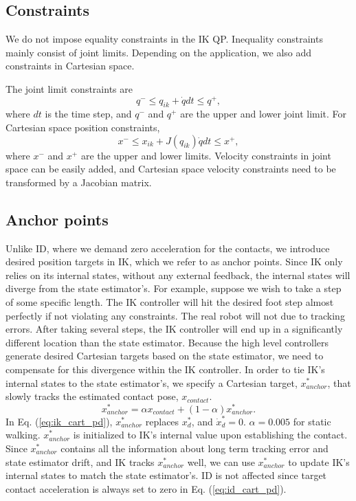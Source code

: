 \documentclass{ws-ijhr}
\newcommand{\eref}[1] {Eq. (\ref{#1})}
\begin{document}
\subsection{Constraints}
We do not impose equality constraints in the IK QP. Inequality constraints 
mainly consist of joint limits. Depending on the application, we also add 
constraints in Cartesian space. 

The joint limit constraints are 
\begin{equation}
  q^- \leq q_{ik} + \dot{q}dt \leq q^+,
\end{equation}
where $dt$ is the time step, and $q^-$ and $q^+$ are the upper and lower joint 
limit. 
For Cartesian space position constraints, 
\begin{equation}
  x^- \leq x_{ik} + J(q_{ik})\dot{q}dt \leq x^+,
	\label{eq:ik_cart_ineq}
\end{equation}
where $x^-$ and $x^+$ are the upper and lower limits. 
Velocity constraints in joint space can be easily added, and Cartesian space 
velocity constraints need to be transformed by a Jacobian matrix. 
 
\subsection{Anchor points}
\label{sec:anchor}
Unlike ID, where we demand zero acceleration for the contacts,
we introduce desired position targets in IK, which we refer to as anchor points. 
Since IK only relies on its internal states, without any external feedback, 
the internal states will diverge from the state estimator's.
For example, suppose we wish to take a step of some specific length. 
The IK controller will hit the desired foot step almost perfectly if not 
violating any constraints. The real robot will not due to tracking errors.
After taking several steps, the IK controller will end up in a significantly
different location than the state estimator. 
Because the high level controllers generate desired Cartesian targets 
based on the state estimator, we need to compensate for this 
divergence within the IK controller. 
In order to tie IK's internal states to the state estimator's, we specify a Cartesian
target, $x_{anchor}^*$, that slowly tracks the estimated contact
pose, $x_{contact}$.
\begin{equation}
\label{eq:leaky}
  x_{anchor}^* = \alpha x_{contact} + (1-\alpha)x_{anchor}^*.
\end{equation}
In \eref{eq:ik_cart_pd}, $x_{anchor}^*$ replaces $x^*_d$, and $\dot{x}^*_d = 0$.
$\alpha = 0.005$ for static walking. 
$x_{anchor}^*$ is initialized to IK's internal value upon establishing the contact. 
Since $x_{anchor}^*$ contains all the information about long term tracking error
and state estimator drift, and IK tracks $x_{anchor}^*$ well, we can use 
$x_{anchor}^*$ to update IK's internal states to match the state estimator's. ID is 
not affected since target contact acceleration is always set to zero in \eref{eq:id_cart_pd}.
 
\end{document}
